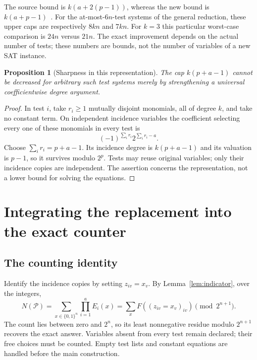 \documentclass[11pt]{article}
\newtheorem{proposition}[theorem]{Proposition}
\theoremstyle{definition}
\theoremstyle{remark}
\begin{document}
The source bound is $k(a+2(p-1))$, whereas the new bound is
$k(a+p-1)$~\cite{reduction}. For the at-most-$6n$-test systems of the
general reduction, these upper caps are respectively $8kn$ and $7kn$.
For $k=3$ this particular worst-case comparison is $24n$ versus $21n$.
The exact improvement depends on the actual number of tests; these numbers
are bounds, not the number of variables of a new SAT instance.

\begin{proposition}[Sharpness in this representation]\label{prop:sharp}
The cap $k(p+a-1)$ cannot be decreased for arbitrary such test systems merely
by strengthening a universal coefficientwise degree argument.
\end{proposition}
\begin{proof}
In test $i$, take $r_i\ge1$ mutually disjoint monomials, all of degree $k$,
and take no constant term. On independent incidence variables the coefficient
selecting every one of these monomials in every test is
\[
 (-1)^{\sum_i r_i}2^{\sum_i r_i-a}.
\]
Choose $\sum_i r_i=p+a-1$. Its incidence degree is $k(p+a-1)$ and its
valuation is $p-1$, so it survives modulo $2^p$. Tests may reuse original
variables; only their incidence copies are independent. The assertion concerns
the representation, not a lower bound for solving the equations.
\end{proof}

\section{Integrating the replacement into the exact counter}\label{sec:integration}

\subsection{The counting identity}
Identify the incidence copies by setting $z_{iv}=x_v$. By
Lemma~\ref{lem:indicator}, over the integers,
\begin{equation}\label{eq:exact-count}
 N(\mathcal P)=\sum_{x\in\{0,1\}^n}\prod_{i=1}^aE_i(x)
             =\sum_xF((z_{iv}=x_v)_{iv})\pmod{2^{n+1}}.
\end{equation}
The count lies between zero and $2^n$, so its least nonnegative residue modulo
$2^{n+1}$ recovers the exact answer. Variables absent from every test remain
declared; their free choices must be counted. Empty test lists and constant
equations are handled before the main construction.
\end{document}
